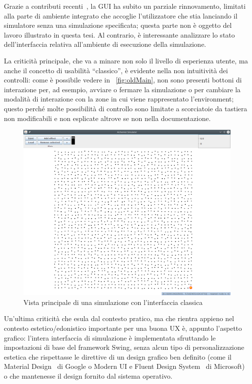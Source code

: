                 Grazie a contributi recenti~\cite{casadio}, la GUI ha subito un parziale rinnovamento, limitati alla parte di ambiente integrato che accoglie l'utilizzatore che stia lanciando il simulatore senza una simulazione specificata; questa parte non è oggetto del lavoro illustrato in questa tesi. Al contrario, è interessante analizzare lo stato dell'interfaccia relativa all'ambiente di esecuzione della simulazione.

                La criticità principale, che va a minare non solo il livello di esperienza utente, ma anche il concetto di usabilità  ``classico'', è evidente nella non intuitività dei controlli: come è possibile vedere in \figurename~\vref{fig:oldMain}, non sono presenti bottoni di interazione per, ad esempio, avviare o fermare la simulazione o per cambiare la modalità di interazione con la zone in cui viene rappresentato l'environment; questo perché molte possibilità di controllo sono limitate a scorciatoie da tastiera non modificabili e non esplicate altrove se non nella documentazione.

                \begin{figure}[htbp]\label{fig:oldMain}
                    \centering
                    \includegraphics[scale=.35]{img/oldMain}
                    \caption{Vista principale di una simulazione con l'interfaccia classica}
                \end{figure}

                Un'ultima criticità che esula dal contesto pratico, ma che rientra appieno nel contesto estetico/edonistico importante per una buona UX è, appunto l'aspetto grafico: l'intera interfaccia di simulazione è implementata sfruttando le impostazioni di base del framework Swing, senza alcun tipo di personalizzazione estetica che rispettasse le direttive di un design grafico ben definito (come il Material Design~\cite{material} di Google o Modern UI e Fluent Design System~\cite{fluent} di Microsoft) o che mantenesse il design fornito dal sistema operativo.

